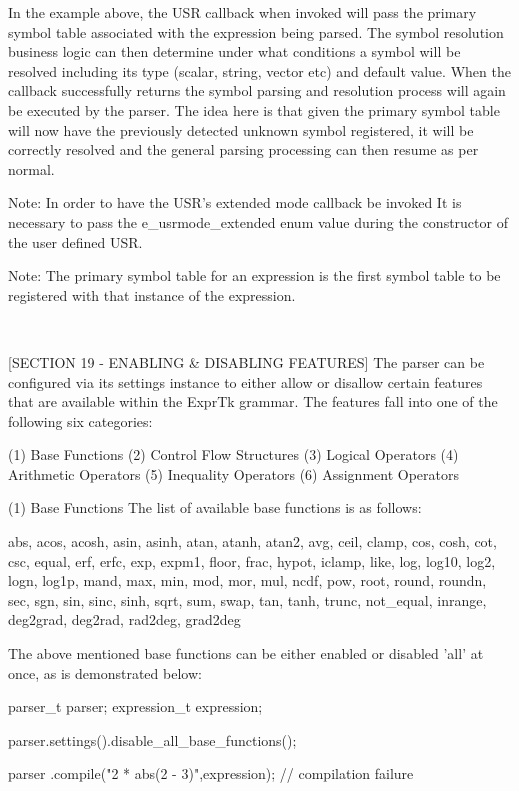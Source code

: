 In the  example above,  the USR  callback when  invoked will  pass the
primary symbol table associated with the expression being parsed.  The
symbol  resolution  business  logic  can  then  determine  under  what
conditions  a  symbol will  be  resolved including  its  type (scalar,
string, vector etc) and default value. When the callback  successfully
returns  the  symbol  parsing and  resolution  process  will again  be
executed by the parser. The idea here is that given the primary symbol
table will now have the previously detected unknown symbol registered,
it will be correctly resolved  and the general parsing processing  can
then resume as per normal.

Note: In order to have the USR's extended mode callback be invoked  It
is  necessary to  pass the  e\_usrmode\_extended enum  value during  the
constructor of the user defined USR.

Note: The primary symbol table  for an expression is the  first symbol
table to be registered with that instance of the expression.

~~~~~~~~~~~~~~~~~~~~~~~~~~~~~~~~~~~~~~~~~~~~~~~~~~~~~~~~~~

[SECTION 19 - ENABLING \& DISABLING FEATURES]
The parser can be configured via its settings instance to either allow
or  disallow certain  features that  are available  within the  ExprTk
grammar. The features fall  into one  of the following six categories:

(1) Base Functions
(2) Control Flow Structures
(3) Logical Operators
(4) Arithmetic Operators
(5) Inequality Operators
(6) Assignment Operators


(1) Base Functions
The list of available base functions is as follows:

abs, acos, acosh, asin,  asinh, atan, atanh, atan2,  avg, ceil,
clamp,  cos,  cosh, cot,  csc,  equal, erf,  erfc,  exp, expm1,
floor,  frac,  hypot,  iclamp, like,  log,  log10,  log2, logn,
log1p, mand, max, min, mod,  mor, mul, ncdf, pow, root,  round,
roundn, sec, sgn, sin, sinc, sinh, sqrt, sum, swap, tan,  tanh,
trunc, not\_equal, inrange, deg2grad, deg2rad, rad2deg, grad2deg


The above mentioned base functions  can be either enabled or  disabled
'all' at once, as is demonstrated below:

parser\_t parser;
expression\_t expression;

parser.settings().disable\_all\_base\_functions();

parser
.compile("2 * abs(2 - 3)",expression); // compilation failure


